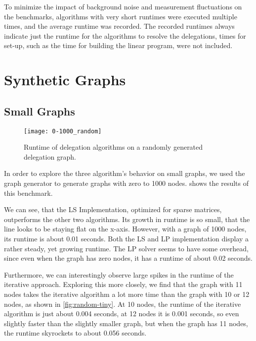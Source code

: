 To minimize the impact of background noise and measurement fluctuations on the benchmarks, algorithms with very short runtimes were executed multiple times, and the average runtime was recorded. The recorded runtimes always indicate just the runtime for the algorithms to resolve the delegations, times for set-up, such as the time for building the linear program, were not included. 


\section{Synthetic Graphs}

\subsection{Small Graphs}
\label{subsec:small_graphs}

\begin{figure}[t]
    \centering
    \texttt{[image: 0-1000\_random]}
    \caption{Runtime of delegation algorithms on a randomly generated delegation graph.}
    \label{fig:random-small}
\end{figure}

In order to explore the three algorithm's behavior on small graphs, we used the graph generator to generate graphs with zero to 1000 nodes.  shows the results of this benchmark.

We can see, that the LS Implementation, optimized for sparse matrices, outperforms the other two algorithms. Its growth in runtime is so small, that the line looks to be staying flat on the x-axis. However, with a graph of 1000 nodes, its runtime is about 0.01 seconds. Both the LS and LP implementation display a rather steady, yet growing runtime. The LP solver seems to have some overhead, since even when the graph has zero nodes, it has a runtime of about 0.02 seconds.

Furthermore, we can interestingly observe large spikes in the runtime of the iterative approach. Exploring this more closely, we find that the graph with 11 nodes takes the iterative algorithm a lot more time than the graph with 10 or 12 nodes, as shown in \cref{fig:random-tiny}. At 10 nodes, the runtime of the iterative algorithm is just about 0.004 seconds, at 12 nodes it is 0.001 seconds, so even slightly faster than the slightly smaller graph, but when the graph has 11 nodes, the runtime skyrockets to about 0.056 seconds.

